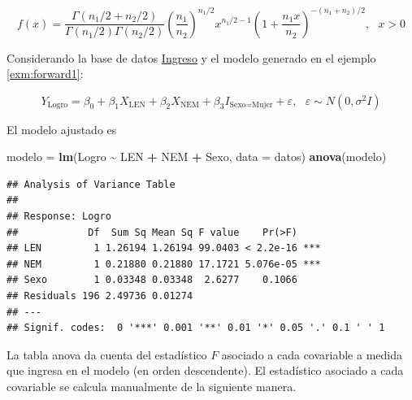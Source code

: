 \documentclass[
  11pt,
]{book}
\newenvironment{Shaded}{\begin{snugshade}}{\end{snugshade}}
\newcommand{\AttributeTok}[1]{\textcolor[rgb]{0.13,0.29,0.53}{#1}}
\newcommand{\FunctionTok}[1]{\textcolor[rgb]{0.13,0.29,0.53}{\textbf{#1}}}
\newcommand{\NormalTok}[1]{#1}
\newcommand{\OtherTok}[1]{\textcolor[rgb]{0.56,0.35,0.01}{#1}}
\newcommand{\SpecialCharTok}[1]{\textcolor[rgb]{0.81,0.36,0.00}{\textbf{#1}}}
\theoremstyle{definition}
\theoremstyle{definition}
\theoremstyle{definition}
\theoremstyle{definition}
\theoremstyle{remark}
\begin{document}
\begin{equation}
f(x) = \frac{\Gamma(n_1/2+n_2/2)}{\Gamma(n_1/2)\Gamma(n_2/2)}\left(\frac{n_1}{n_2}\right)^{n_1/2}x^{n_1/2-1}\left(1+\frac{n_1x}{n_2}\right)^{-(n_1 + n_2)/2}, \text{ }x>0
\label{eq:distribucionF}
\end{equation}

Considerando la base de datos \hyperref[Ingreso]{Ingreso} y el modelo generado en el ejemplo \ref{exm:forward1}:

\[
Y_{\text{Logro}} = \beta_0 + \beta_1X_{\text{LEN}} + \beta_2X_{\text{NEM}} + \beta_3I_{\text{Sexo=Mujer}} + \varepsilon, \text{ } \varepsilon \sim N(0,\sigma^2I)
\]

El modelo ajustado es

\begin{Shaded}
\begin{Highlighting}[]
\NormalTok{modelo }\OtherTok{=} \FunctionTok{lm}\NormalTok{(Logro }\SpecialCharTok{\textasciitilde{}}\NormalTok{ LEN }\SpecialCharTok{+}\NormalTok{ NEM }\SpecialCharTok{+}\NormalTok{ Sexo, }\AttributeTok{data =}\NormalTok{ datos)}
\FunctionTok{anova}\NormalTok{(modelo)}
\end{Highlighting}
\end{Shaded}

\begin{verbatim}
## Analysis of Variance Table
## 
## Response: Logro
##            Df  Sum Sq Mean Sq F value    Pr(>F)    
## LEN         1 1.26194 1.26194 99.0403 < 2.2e-16 ***
## NEM         1 0.21880 0.21880 17.1721 5.076e-05 ***
## Sexo        1 0.03348 0.03348  2.6277    0.1066    
## Residuals 196 2.49736 0.01274                      
## ---
## Signif. codes:  0 '***' 0.001 '**' 0.01 '*' 0.05 '.' 0.1 ' ' 1
\end{verbatim}

La tabla anova da cuenta del estadístico \(F\) asociado a cada covariable a medida que ingresa en el modelo (en orden descendente). El estadístico asociado a cada covariable se calcula manualmente de la siguiente manera.
\end{document}
